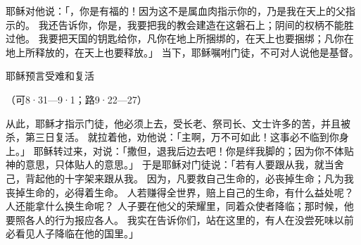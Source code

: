 {耶稣对他说：「{}，你是有福的！因为这不是属血肉{}指示你的，乃是我在天上的父指示的。
我还告诉你，你是{}，我要把我的教会建造在这磐石上；阴间的权柄不能胜过他。
我要把天国的钥匙给你，凡你在地上所捆绑的，在天上也要捆绑；凡你在地上所释放的，在天上也要释放。」
当下，耶稣嘱咐门徒，不可对人说他是基督。
\par }{\SH 耶稣预言受难和复活
\par }{\R （可8·31—9·1；路9·22—27）
\par }{\PP {}从此，耶稣才指示门徒，他必须上{}去，受长老、祭司长、文士许多的苦，并且被杀，第三日复活。
就拉着他，劝他说：「主啊，万不可如此！这事必不临到你身上。」
耶稣转过来，对{}说：「撒但，退我后边去吧！你是绊我脚的；因为你不体贴　神的意思，只体贴人的意思。」
于是耶稣对门徒说：「若有人要跟从我，就当舍己，背起他的十字架来跟从我。
因为，凡要救自己生命的，必丧掉生命；凡为我丧掉生命的，必得着生命。
人若赚得全世界，赔上自己的生命，有什么益处呢？人还能拿什么换生命呢？
人子要在他父的荣耀里，同着众使者降临；那时候，他要照各人的行为报应各人。
我实在告诉你们，站在这里的，有人在没尝死味以前必看见人子降临在他的国里。」

}
